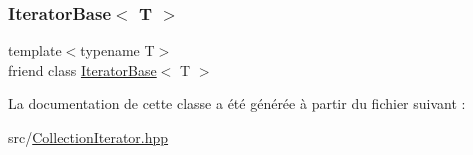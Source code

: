 \subsubsection{\texorpdfstring{Iterator\+Base$<$ T $>$}{IteratorBase< T >}}
{\footnotesize\ttfamily template$<$typename T$>$ \\
friend class \hyperlink{class_iterator_base}{Iterator\+Base}$<$ T $>$\hspace{0.3cm}{\ttfamily [friend]}}



La documentation de cette classe a été générée à partir du fichier suivant \+:\begin{DoxyCompactItemize}
\item 
src/\hyperlink{_collection_iterator_8hpp}{Collection\+Iterator.\+hpp}\end{DoxyCompactItemize}
